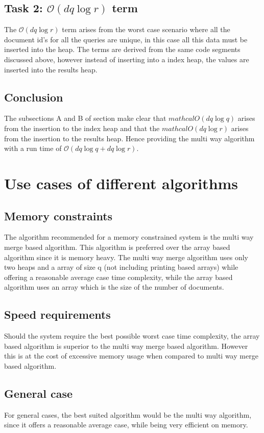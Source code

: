 \documentclass[%
 aip,
 jmp,%
 amsmath,amssymb,
 reprint,%
]{revtex4-1}
\newcommand{\rom}[1]{\uppercase\expandafter{\romannumeral #1\relax}}
\begin{document}
\subsection{\label{sec1:level3}Task 2: $\mathcal{O}(dq\log{}r )$ term}

\begin{center}
The $\mathcal{O}(dq\log{}r )$ term arises from the worst case scenario where all the document id's for all the queries are unique, in this case all this data must be inserted into the heap. The terms are derived from the same code segments discussed above, however instead of inserting into a index heap, the values are inserted into the results heap.  
\end{center}

\subsection{\label{sec1:level4} Conclusion}

\begin{center}
The subsections A and B of section \rom{2} make clear that 
$mathcal{O}(dq\log{}q)$ arises from the insertion to the index heap and
that the $mathcal{O}(dq\log{}r)$ arises from the insertion to the results heap. 
Hence providing the multi way algorithm with a run time of
$\mathcal{O}(dq\log{}q + dq\log{}r)$.
\end{center}

\section{\label{sec2:level1} Use cases of different algorithms}

\subsection{\label{sec2:level2} Memory constraints}

\begin{center}
The algorithm recommended for a memory constrained system is the multi way 
merge based algorithm. This algorithm is preferred over the array based algorithm
since it is memory heavy. The multi way merge algorithm uses only two heaps and a array of size q (not including printing based arrays) while offering
a reasonable average case time complexity, while the array based algorithm uses 
an array which is the size of the number of documents.
\end{center}

\subsection{\label{sec2:level3} Speed requirements}
Should the system require the best possible worst case time complexity, the 
array based algorithm is superior to the multi way merge based algorithm. 
However this is at the cost of excessive memory usage when compared to multi way
merge based algorithm.

\subsection{\label{sec2:level4} General case}
For general cases, the best suited algorithm would be the multi way algorithm, since
it offers a reasonable average case, while being very efficient on memory.
 
\end{document}
